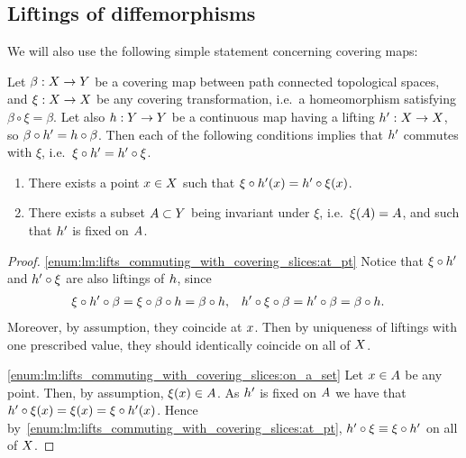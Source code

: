 \subsection{Liftings of diffemorphisms}
We will also use the following simple statement concerning covering maps:
\begin{lemma}\label{lm:lifts_commuting_with_covering_slices}
Let $\beta:X\to Y$ be a covering map between path connected topological spaces, and $\xi:X\to X$ be any covering transformation, i.e.\ a homeomorphism satisfying $\beta\circ\xi=\beta$.
Let also $h:Y\to Y$ be a continuous map having a lifting $h':X\to X$, so $\beta\circ h' = h\circ\beta$.
Then each of the following conditions implies that $h'$ commutes with $\xi$, i.e.\ $\xi\circ h'=h'\circ\xi$.
\begin{enumerate}[label={\rm(\arabic*)}]
\item\label{enum:lm:lifts_commuting_with_covering_slices:at_pt}
There exists a point $x\in X$ such that $\xi\circ h'(x)=h'\circ\xi(x)$.
\item\label{enum:lm:lifts_commuting_with_covering_slices:on_a_set}
There exists a subset $A\subset Y$ being invariant under $\xi$, i.e.\ $\xi(A)=A$, and such that $h'$ is fixed on $A$.
\end{enumerate}
\end{lemma}
\begin{proof}
\ref{enum:lm:lifts_commuting_with_covering_slices:at_pt}
Notice that $\xi\circ h'$ and $h'\circ\xi$ are also liftings of $h$, since
\begin{align*}
    &\xi\circ h'\circ\beta =  \xi\circ\beta\circ h = \beta\circ h,&
    &h'\circ\xi\circ\beta =  h'\circ\beta = \beta\circ h.
\end{align*}
Moreover, by assumption, they coincide at $x$.
Then by uniqueness of liftings with one prescribed value, they should identically coincide on all of $X$.

\ref{enum:lm:lifts_commuting_with_covering_slices:on_a_set}
Let $x\in A$ be any point.
Then, by assumption, $\xi(x)\in A$.
As $h'$ is fixed on $A$ we have that $h'\circ\xi(x) = \xi(x) = \xi\circ h'(x)$.
Hence by~\ref{enum:lm:lifts_commuting_with_covering_slices:at_pt}, $h'\circ\xi \equiv \xi\circ h'$ on all of $X$.
\end{proof}





